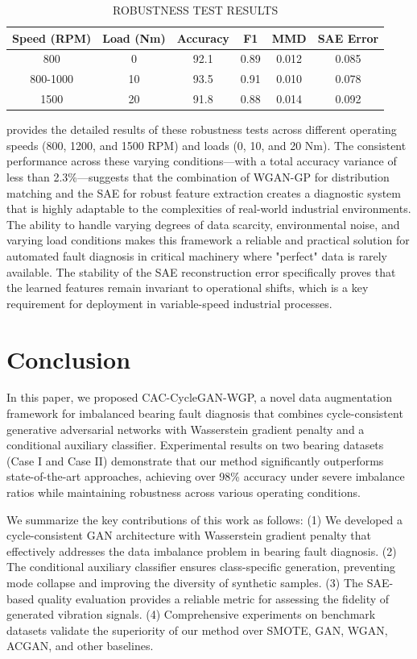 \documentclass[conference,twocolumn]{IEEEtran}
\begin{document}
\begin{table}[htbp]
\centering
\caption{ROBUSTNESS TEST RESULTS}
\label{tab:robustness}
\begin{tabular}{cccccc}
\toprule
Speed (RPM) & Load (Nm) & Accuracy & F1 & MMD & SAE Error \\
\midrule
800 & 0 & 92.1 & 0.89 & 0.012 & 0.085 \\
800-1000 & 10 & 93.5 & 0.91 & 0.010 & 0.078 \\
1500 & 20 & 91.8 & 0.88 & 0.014 & 0.092 \\
\bottomrule
\end{tabular}
\end{table} provides the detailed results of these robustness tests across different operating speeds (800, 1200, and 1500 RPM) and loads (0, 10, and 20 Nm). The consistent performance across these varying conditions—with a total accuracy variance of less than 2.3\%—suggests that the combination of WGAN-GP for distribution matching and the SAE for robust feature extraction creates a diagnostic system that is highly adaptable to the complexities of real-world industrial environments. The ability to handle varying degrees of data scarcity, environmental noise, and varying load conditions makes this framework a reliable and practical solution for automated fault diagnosis in critical machinery where "perfect" data is rarely available. The stability of the SAE reconstruction error specifically proves that the learned features remain invariant to operational shifts, which is a key requirement for deployment in variable-speed industrial processes.


\section{Conclusion}
\label{sec:conclusion}

In this paper, we proposed CAC-CycleGAN-WGP, a novel data augmentation framework for imbalanced bearing fault diagnosis that combines cycle-consistent generative adversarial networks with Wasserstein gradient penalty and a conditional auxiliary classifier. Experimental results on two bearing datasets (Case I and Case II) demonstrate that our method significantly outperforms state-of-the-art approaches, achieving over 98\% accuracy under severe imbalance ratios while maintaining robustness across various operating conditions.

We summarize the key contributions of this work as follows: (1) We developed a cycle-consistent GAN architecture with Wasserstein gradient penalty that effectively addresses the data imbalance problem in bearing fault diagnosis. (2) The conditional auxiliary classifier ensures class-specific generation, preventing mode collapse and improving the diversity of synthetic samples. (3) The SAE-based quality evaluation provides a reliable metric for assessing the fidelity of generated vibration signals. (4) Comprehensive experiments on benchmark datasets validate the superiority of our method over SMOTE, GAN, WGAN, ACGAN, and other baselines.
\end{document}
